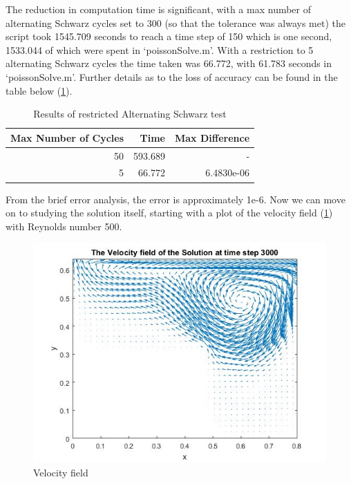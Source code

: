 \documentclass[11pt,a4paper,notitlepage]{article}
\begin{document}
The reduction in computation time is significant, with a max number of alternating Schwarz cycles set to 300 (so that the tolerance was always met) the script took 1545.709 seconds to reach a time step of 150 which is one second, 1533.044 of which were spent in `poissonSolve.m'. With a restriction to 5 alternating Schwarz cycles the time taken was 66.772, with 61.783 seconds in `poissonSolve.m'. Further details as to the loss of accuracy can be found in the table below (\ref{cav.tab1}).

\begin{table}[h] 
  \begin{center}
    \begin{tabular}{|rrr|}
	\hline
	Max Number of Cycles &  Time & Max Difference\\  
    \hline
	50 & 	593.689 & - \\
	5 & 	66.772 & 6.4830e-06 \\
    \hline
    \end{tabular}
  \end{center}
  \vspace{-10pt}
  \caption{Results of restricted Alternating Schwarz test}
  \label{cav.tab1}
\end{table}

From the brief error analysis, the error is approximately 1e-6. Now we can move on to studying the solution itself, starting with a plot of the velocity field (\ref{cav.vel1}) with Reynolds number 500.

\begin{figure}[h] 
\centering
\includegraphics[width=1.1\linewidth]{CavityVel1.jpg}
\caption{Velocity field}
\label{cav.vel1}
\end{figure}
\end{document}
